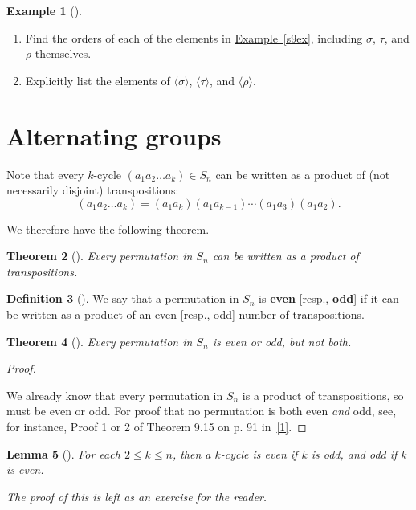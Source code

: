 \documentclass[10pt,]{book}
\newcommand{\terminology}[1]{\textbf{#1}}
\theoremstyle{plain}
\newtheorem{theorem}{Theorem}[section]
\newtheorem{lemma}[theorem]{Lemma}
\theoremstyle{definition}
\newtheorem{definition}[theorem]{Definition}
\theoremstyle{definition}
\theoremstyle{definition}
\newtheorem{example}[theorem]{Example}
\theoremstyle{definition}
\numberwithin{equation}{section}
\begin{document}
\begin{example}[]\label{example-58}
\leavevmode%
\begin{enumerate}
\item\hypertarget{li-339}{}Find the orders of each of the elements in \hyperref[s9ex]{Example~\ref{s9ex}}, including \(\sigma\), \(\tau\), and \(\rho\) themselves.%
\item\hypertarget{li-340}{}Explicitly list the elements of \(\langle \sigma\rangle\), \(\langle \tau\rangle\), and \(\langle \rho\rangle\).%
\end{enumerate}
%
\end{example}
\typeout{************************************************}
\typeout{************************************************}
\section[{Alternating groups}]{Alternating groups}\label{altgps}
Note that every \(k\)-cycle \((a_1a_2\ldots a_k)\in S_n\) can be written as a product of (not necessarily disjoint) transpositions:%
\begin{equation*}
(a_1a_2\ldots a_k)=(a_1a_k)(a_1a_{k-1})\cdots(a_1a_3)(a_1a_2).
\end{equation*}
%
\par
We therefore have the following theorem.%
\begin{theorem}[{}]\label{theorem-37}
Every permutation in \(S_n\) can be written as a product of transpositions.%
\end{theorem}
\begin{definition}[{}]\label{definition-51}
We say that a permutation in \(S_n\) is \terminology{even} [resp., \terminology{odd}] if it can be written as a product of an even [resp., odd] number of transpositions.%
\end{definition}
\begin{theorem}[{}]\label{theorem-38}
Every permutation in \(S_n\) is even or odd, but not both.%
\end{theorem}
\begin{proof}\hypertarget{proof-32}{}
We already know that every permutation in \(S_n\) is a product of transpositions, so must be even or odd. For proof that no permutation is both even \emph{and} odd, see, for instance, Proof 1 or 2 of Theorem 9.15 on p. 91 in~\hyperlink{F}{[1]}.%
\end{proof}
\begin{lemma}[{}]\label{evenodd}
For each \(2\leq k\leq n\), then a \(k\)-cycle is even if \(k\) is odd, and odd if \(k\) is even.%
\par
The proof of this is left as an exercise for the reader.%
\end{lemma}
\end{document}
